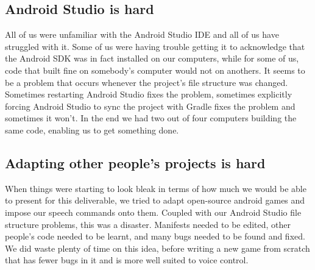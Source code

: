\documentclass[11pt, oneside]{article}
\begin{document}
\subsection*{Android Studio is hard}

All of us were unfamiliar with the Android Studio IDE and all of us
have struggled with it. Some of us were having trouble getting it to
acknowledge that the Android SDK was in fact installed on our
computers, while for some of us, code that built fine on somebody’s
computer would not on anothers. It seems to be a problem that occurs
whenever the project’s file structure was changed. Sometimes
restarting Android Studio fixes the problem, sometimes explicitly
forcing Android Studio to sync the project with Gradle fixes the
problem and sometimes it won’t. In the end we had two out of four
computers building the same code, enabling us to get something done.

\subsection*{Adapting other people's projects is hard}

When things were starting to look bleak in terms of how much we would
be able to present for this deliverable, we tried to adapt open-source
android games and impose our speech commands onto them. Coupled with
our Android Studio file structure problems, this was a disaster.
Manifests needed to be edited, other people’s code needed to be
learnt, and many bugs needed to be found and fixed.  We did waste
plenty of time on this idea, before writing a new game from scratch
that has fewer bugs in it and is more well suited to voice control.
\end{document}
